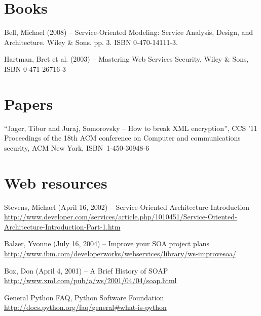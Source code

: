 

%
%

%
%


\begin{thebibliography}{99}

\section*{Books}

Bell, Michael (2008) -- Service-Oriented Modeling: Service Analysis, Design, and Architecture. Wiley & Sons. pp. 3. ISBN 0-470-14111-3.

Hartman, Bret et al. (2003) -- Mastering Web Services Security, Wiley \& Sons, ISBN 0-471-26716-3

\section*{Papers}

``Jager, Tibor and Juraj, Somorovsky -- How to break XML encryption'',
CCS '11 Proceedings of the 18th ACM conference on Computer and communications security,
ACM New York, \mbox{ISBN 1-450-30948-6}

\section*{Web resources}

Stevens, Michael (April 16, 2002) -- Service-Oriented Architecture Introduction
\url{http://www.developer.com/services/article.php/1010451/Service-Oriented-Architecture-Introduction-Part-1.htm}

Balzer, Yvonne (July 16, 2004) -- Improve your SOA project plans\\
\url{http://www.ibm.com/developerworks/webservices/library/ws-improvesoa/}

Box, Don (April 4, 2001) -- A Brief History of SOAP\\
\url{http://www.xml.com/pub/a/ws/2001/04/04/soap.html}


General Python FAQ, Python Software Foundation\\
\url{http://docs.python.org/faq/general#what-is-python}


\end{thebibliography}
